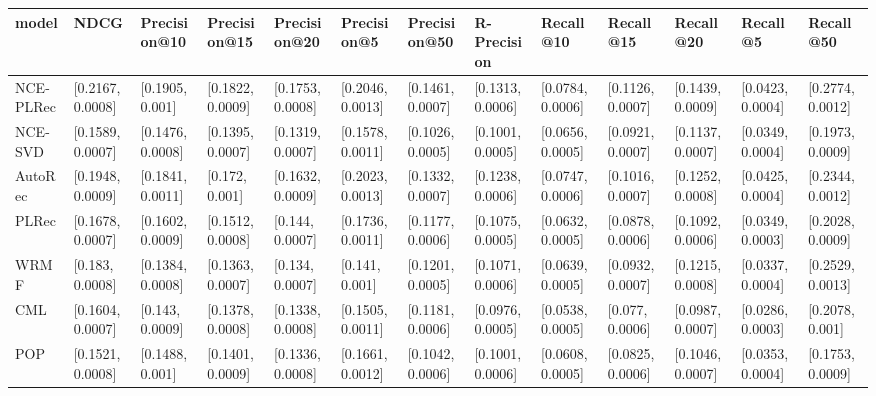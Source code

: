 \begin{tabular}{lllllllllllll}
\toprule
     model &              NDCG &      Precision@10 &      Precision@15 &      Precision@20 &       Precision@5 &      Precision@50 &       R-Precision &         Recall@10 &         Recall@15 &         Recall@20 &          Recall@5 &         Recall@50 \\
\midrule
 NCE-PLRec &  [0.2167, 0.0008] &   [0.1905, 0.001] &  [0.1822, 0.0009] &  [0.1753, 0.0008] &  [0.2046, 0.0013] &  [0.1461, 0.0007] &  [0.1313, 0.0006] &  [0.0784, 0.0006] &  [0.1126, 0.0007] &  [0.1439, 0.0009] &  [0.0423, 0.0004] &  [0.2774, 0.0012] \\
   NCE-SVD &  [0.1589, 0.0007] &  [0.1476, 0.0008] &  [0.1395, 0.0007] &  [0.1319, 0.0007] &  [0.1578, 0.0011] &  [0.1026, 0.0005] &  [0.1001, 0.0005] &  [0.0656, 0.0005] &  [0.0921, 0.0007] &  [0.1137, 0.0007] &  [0.0349, 0.0004] &  [0.1973, 0.0009] \\
   AutoRec &  [0.1948, 0.0009] &  [0.1841, 0.0011] &    [0.172, 0.001] &  [0.1632, 0.0009] &  [0.2023, 0.0013] &  [0.1332, 0.0007] &  [0.1238, 0.0006] &  [0.0747, 0.0006] &  [0.1016, 0.0007] &  [0.1252, 0.0008] &  [0.0425, 0.0004] &  [0.2344, 0.0012] \\
     PLRec &  [0.1678, 0.0007] &  [0.1602, 0.0009] &  [0.1512, 0.0008] &   [0.144, 0.0007] &  [0.1736, 0.0011] &  [0.1177, 0.0006] &  [0.1075, 0.0005] &  [0.0632, 0.0005] &  [0.0878, 0.0006] &  [0.1092, 0.0006] &  [0.0349, 0.0003] &  [0.2028, 0.0009] \\
      WRMF &   [0.183, 0.0008] &  [0.1384, 0.0008] &  [0.1363, 0.0007] &   [0.134, 0.0007] &    [0.141, 0.001] &  [0.1201, 0.0005] &  [0.1071, 0.0006] &  [0.0639, 0.0005] &  [0.0932, 0.0007] &  [0.1215, 0.0008] &  [0.0337, 0.0004] &  [0.2529, 0.0013] \\
       CML &  [0.1604, 0.0007] &   [0.143, 0.0009] &  [0.1378, 0.0008] &  [0.1338, 0.0008] &  [0.1505, 0.0011] &  [0.1181, 0.0006] &  [0.0976, 0.0005] &  [0.0538, 0.0005] &   [0.077, 0.0006] &  [0.0987, 0.0007] &  [0.0286, 0.0003] &   [0.2078, 0.001] \\
       POP &  [0.1521, 0.0008] &   [0.1488, 0.001] &  [0.1401, 0.0009] &  [0.1336, 0.0008] &  [0.1661, 0.0012] &  [0.1042, 0.0006] &  [0.1001, 0.0006] &  [0.0608, 0.0005] &  [0.0825, 0.0006] &  [0.1046, 0.0007] &  [0.0353, 0.0004] &  [0.1753, 0.0009] \\
\bottomrule
\end{tabular}
